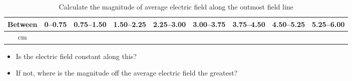 \documentclass{article}
\begin{document}
\begin{table}[h!]
  \begin{center}
    \caption{Calculate the magnitude of average electric field along the outmost field line}\label{tab:table1}
    \begin{tabular}{|c|c|c|c|c|c|c|c|c|}\hline
      Between & 0--0.75 & 0.75--1.50 & 1.50--2.25 & 2.25--3.00 & 3.00--3.75 & 3.75--4.50 & 4.50--5.25 & 5.25--6.00 \\ \hline
      cm & & & & & & & & \\ \hline
    \end{tabular}
  \end{center}
\end{table}
\begin{itemize}
  \item Is the electric field constant along this?
  \item If not, where is the magnitude off the average electric field the greatest?
\end{itemize}
\end{document}
